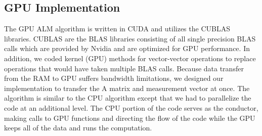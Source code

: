 \documentclass[10pt,twocolumn,letterpaper]{article}
\begin{document}


\subsection{ GPU Implementation}
The GPU ALM algorithm is written in CUDA and utilizes the CUBLAS libraries.
CUBLAS are the BLAS libraries consisting of all single precision BLAS calls
which are provided by Nvidia and are optimized for GPU performance. In
addition, we coded kernel (GPU) methods for vector-vector operations to replace
operations that would have taken multiple BLAS calls. Because data transfer from the RAM to GPU suffers bandwidth limitations, we designed our implementation to transfer the A matrix and measurement vector at once.  The algorithm is similar
to the CPU algorithm except that we had to parallelize the code at an
additional level. The CPU portion of the code serves as the conductor, making
calls to GPU functions and directing the flow of the code while the GPU keeps all of the data and runs the computation.
\end{document}
